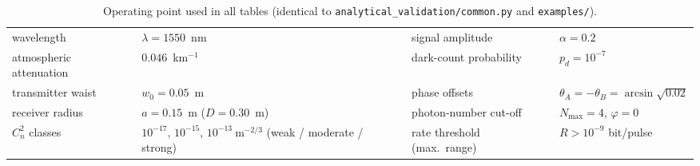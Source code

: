 \begin{table}[htbp]
\centering\small
\caption{Operating point used in all tables (identical to \texttt{analytical\_validation/common.py} and \texttt{examples/}).}
\label{tab:params}
\begin{tabular}{ll@{\qquad}ll}
\toprule
wavelength & $\lambda=1550$~nm & signal amplitude & $\alpha=0.2$ \\
atmospheric attenuation & $0.046$~km$^{-1}$ & dark-count probability & $p_d=10^{-7}$ \\
transmitter waist & $w_0=0.05$~m & phase offsets & $\theta_A=-\theta_B=\arcsin\sqrt{0.02}$ \\
receiver radius & $a=0.15$~m ($D=0.30$~m) & photon-number cut-off & $N_{\max}=4$,\; $\varphi=0$ \\
$C_n^2$ classes & $10^{-17},\,10^{-15},\,10^{-13}\ \mathrm{m^{-2/3}}$ (weak / moderate / strong) & rate threshold (max.\ range) & $R>10^{-9}$ bit/pulse \\
\bottomrule
\end{tabular}
\end{table}

